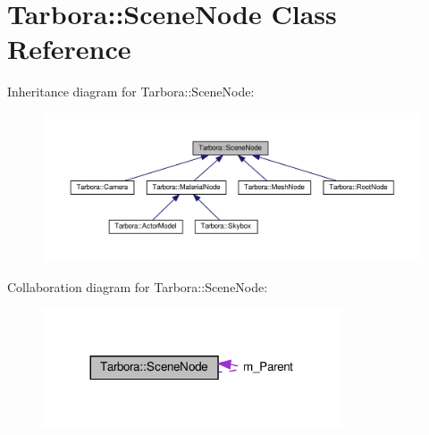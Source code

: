 \hypertarget{classTarbora_1_1SceneNode}{}\section{Tarbora\+:\+:Scene\+Node Class Reference}
\label{classTarbora_1_1SceneNode}


Inheritance diagram for Tarbora\+:\+:Scene\+Node\+:
\nopagebreak
\begin{figure}[H]
\begin{center}
\leavevmode
\includegraphics[width=350pt]{classTarbora_1_1SceneNode__inherit__graph}
\end{center}
\end{figure}


Collaboration diagram for Tarbora\+:\+:Scene\+Node\+:
\nopagebreak
\begin{figure}[H]
\begin{center}
\leavevmode
\includegraphics[width=251pt]{classTarbora_1_1SceneNode__coll__graph}
\end{center}
\end{figure}
